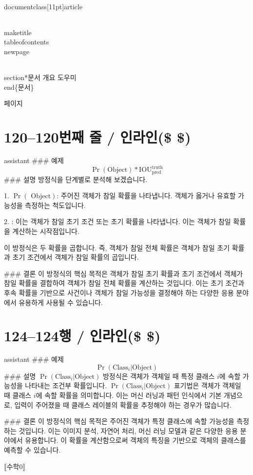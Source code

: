 \\documentclass[11pt]{article}
\begin{document}
\\maketitle
\\tableofcontents
\\newpage

\\section*{문서 개요}
도우미
\\end\{문서\}

\새 페이지

\section*{120–120번째 줄 / 인라인(\$ \$) }
assistant
### 예제
$$
\Pr(\textrm{Object}) * \textrm{IOU}_{\textrm{pred}}^{\textrm{truth}}
$$
### 설명
방정식을 단계별로 분석해 보겠습니다.

1. \(\Pr(\textrm{ Object})\): 주어진 객체가 참일 확률을 나타냅니다. 객체가 옳거나 유효할 가능성을 측정하는 척도입니다.

2. : 이는 객체가 참일 초기 조건 또는 초기 확률을 나타냅니다. 이는 객체가 참일 확률을 계산하는 시작점입니다.

이 방정식은 두 확률을 곱합니다. 즉, 객체가 참일 전체 확률은 객체가 참일 초기 확률과 초기 조건에서 객체가 참일 확률의 곱입니다.

### 결론
이 방정식의 핵심 목적은 객체가 참일 초기 확률과 초기 조건에서 객체가 참일 확률을 결합하여 객체가 참일 전체 확률을 계산하는 것입니다. 이는 초기 조건과 후속 확률을 기반으로 사건이나 객체가 참일 가능성을 결정해야 하는 다양한 응용 분야에서 유용하게 사용될 수 있습니다.

\section*{124–124행 / 인라인(\$ \$)}
assistant
### 예제
$$
\Pr(\textrm{Class}_i | \textrm{Object})
$$
### 설명
\(\Pr(\textrm{Class}_i | \textrm{Object})\) 방정식은 객체가 객체일 때 특정 클래스 \(i\)에 속할 가능성을 나타내는 조건부 확률입니다. \(\Pr(\textrm{Class}_i | \textrm{Object})\) 표기법은 객체가 객체일 때 클래스 \(i\)에 속할 확률을 의미합니다. 이는 머신 러닝과 패턴 인식에서 기본 개념으로, 입력이 주어졌을 때 클래스 레이블의 확률을 추정해야 하는 경우가 많습니다.

### 결론
이 방정식의 핵심 목적은 주어진 객체가 특정 클래스에 속할 가능성을 측정하는 것입니다. 이는 이미지 분석, 자연어 처리, 머신 러닝 모델과 같은 다양한 응용 분야에서 유용합니다. 이 확률을 계산함으로써 객체의 특징을 기반으로 객체의 클래스를 예측할 수 있습니다.

⟦수학0⟧
\end{document}
